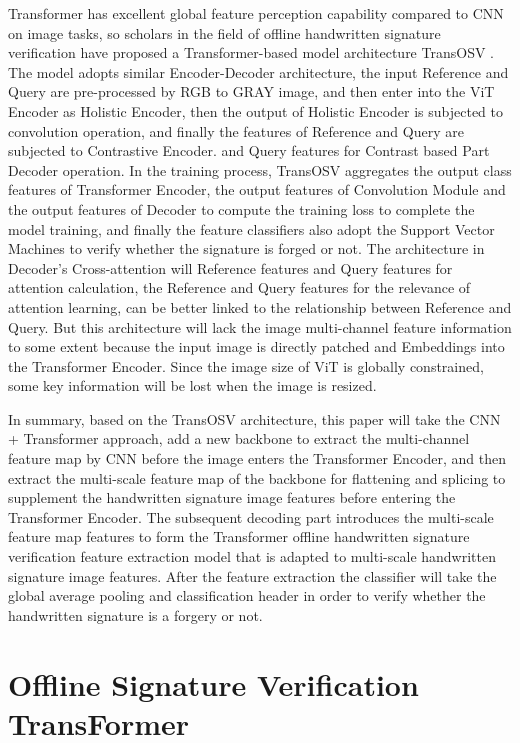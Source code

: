 \documentclass{article}
\begin{document}
Transformer has excellent global feature perception capability compared to CNN on image tasks, so scholars in the field of offline handwritten signature verification have proposed a Transformer-based model architecture TransOSV \cite{20}. The model adopts similar Encoder-Decoder architecture, the input Reference and Query are pre-processed by RGB to GRAY image, and then enter into the ViT Encoder as Holistic Encoder, then the output of Holistic Encoder is subjected to convolution operation, and finally the features of Reference and Query are subjected to Contrastive Encoder. and Query features for Contrast based Part Decoder operation. In the training process, TransOSV aggregates the output class features of Transformer Encoder, the output features of Convolution Module and the output features of Decoder to compute the training loss to complete the model training, and finally the feature classifiers also adopt the Support Vector Machines to verify whether the signature is forged or not. The architecture in Decoder's Cross-attention will Reference features and Query features for attention calculation, the Reference and Query features for the relevance of attention learning, can be better linked to the relationship between Reference and Query. But this architecture will lack the image multi-channel feature information to some extent because the input image is directly patched and Embeddings into the Transformer Encoder. Since the image size of ViT is globally constrained, some key information will be lost when the image is resized.

In summary, based on the TransOSV architecture, this paper will take the CNN + Transformer approach, add a new backbone to extract the multi-channel feature map by CNN before the image enters the Transformer Encoder, and then extract the multi-scale feature map of the backbone for flattening and splicing to supplement the handwritten signature image features before entering the Transformer Encoder. The subsequent decoding part introduces the multi-scale feature map features to form the Transformer offline handwritten signature verification feature extraction model that is adapted to multi-scale handwritten signature image features. After the feature extraction the classifier will take the global average pooling and classification header in order to verify whether the handwritten signature is a forgery or not.

\newpage
\section{Offline Signature Verification TransFormer}
\end{document}
